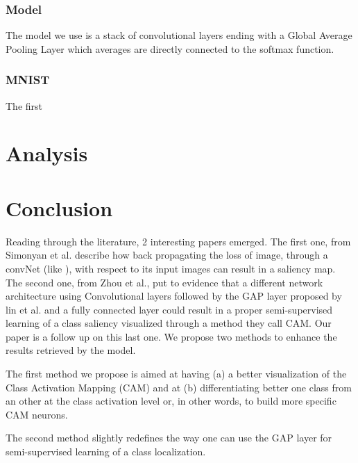 \documentclass[12pt, letterpaper, twoside]{article}
\begin{document}
	\subsubsection{Model}
	\label{ssub:model}
	The model we use is a stack of convolutional layers ending with a Global Average Pooling Layer which averages are directly connected to the softmax function.
	

	\subsubsection{MNIST} 
	\label{ssub:mnist}
	The first 


	\section{Analysis}
	\label{sec:analysis}
	

	\section{Conclusion}
	\label{sec:conclusion}

	Reading through the literature, 2 interesting papers emerged. The first one, from Simonyan et al.\cite{simonyan2013deep} describe how back propagating the loss of image, through a convNet (like \cite{lecun1998gradient}), with respect to its input images can result in a saliency map. The second one, from Zhou et al.\cite{zhou2016learning}, put to evidence that a different network architecture using Convolutional layers followed by the GAP layer proposed by lin et al.\cite{lin2013network} and a fully connected layer could result in a proper semi-supervised learning of a class saliency visualized through a method they call CAM. Our paper is a follow up on this last one. We propose two methods to enhance the results retrieved by the model.

	The first method we propose is aimed at having (a) a better visualization of the Class Activation Mapping (CAM) and at (b) differentiating better one class from an other at the class activation level or, in other words, to build more specific CAM neurons.

	The second method slightly redefines the way one can use the GAP layer for semi-supervised learning of a class localization. 
\end{document}
